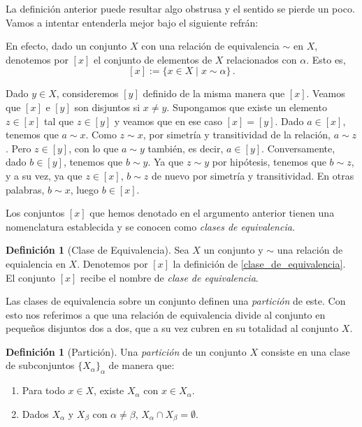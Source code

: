 \documentclass[a4paper,11pt]{amsart}
\theoremstyle{plain}
\theoremstyle{definition}
\newtheorem{defi}[thm]{Definición}
\theoremstyle{remark}
\begin{document}
La definición anterior puede resultar algo obstrusa y el sentido se pierde un poco. Vamos a intentar entenderla mejor bajo el siguiente refrán: 

\begin{center}
\end{center}

En efecto, dado un conjunto $X$ con una relación de equivalencia $\sim$ en $X$, denotemos por $[x]$ el conjunto de elementos de $X$ relacionados con $\alpha$. Esto es,
\begin{equation}
\label{clase_de_equivalencia}    
 [x] := \{ x \in X \mid x \sim \alpha\} \, .
\end{equation}

Dado $y \in X$, consideremos $[y]$ definido de la misma manera que $[x]$. Veamos que $[x]$ e $[y]$ son disjuntos si $x \neq y$. Supongamos que existe un elemento $z \in [x]$ tal que $z \in [y]$ y veamos que en ese caso $[x] = [y]$. Dado $a \in [x]$, tenemos que $a \sim x$. Como $z \sim x$, por simetría y transitividad de la relación, $a \sim z$. Pero $z \in [y]$, con lo que $a \sim y$ también, es decir, $a \in [y]$. Conversamente, dado $b \in [y]$, tenemos que $b \sim y$. Ya que $z \sim y$ por hipótesis, tenemos que $b \sim z$, y a su vez, ya que $z \in [x]$, $b \sim z$ de nuevo por simetría y transitividad. En otras palabras, $b \sim x$, luego $b \in [x]$. 


Los conjuntos $[x]$ que hemos denotado en el argumento anterior tienen una nomenclatura establecida y se conocen como \textit{clases de equivalencia}. 

\begin{defi}[Clase de Equivalencia]
Sea $X$ un conjunto y $\sim$ una relación de equialencia en $X$. Denotemos por $[x]$ la definición de \eqref{clase_de_equivalencia}. El conjunto $[x]$ recibe el nombre de \textit{clase de equivalencia}.
\end{defi}

Las clases de equivalencia sobre un conjunto definen una \textit{partición} de este. Con esto nos referimos a que una relación de equivalencia divide al conjunto en pequeños  disjuntos dos a dos, que a su vez cubren en su totalidad al conjunto $X$.

\begin{defi}[Partición]
Una \textit{partición} de un conjunto $X$ consiste en una clase de subconjuntos $\{ X_{\alpha}\}_{\alpha}$ de manera que:
\begin{enumerate}[label = \arabic*)]
    \item Para todo $x \in X$, existe $X_{\alpha}$ con $x \in X_{\alpha}$.
    \item Dados $X_{\alpha}$ y $X_{\beta}$ con $\alpha \neq \beta$, $X_{\alpha} \cap X_{\beta} = \emptyset$.
\end{enumerate}
\end{defi}
\end{document}
